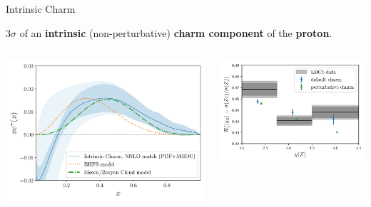 \documentclass[9pt]{beamer}
\begin{document}
\begin{frame}{Intrinsic Charm}
    \vspace*{-15pt}
    \begin{center}
        $3\sigma$ of an \textbf{intrinsic} (non-perturbative)
        \textbf{\alert{charm} component} of the \textbf{proton}.

    \end{center}
    \vspace*{15pt}

    \begin{columns}
        \begin{column}{0.5\textwidth}
            \begin{tcolorbox}
                \includegraphics[width=\textwidth]{nf3_to_models}
            \end{tcolorbox}
        \end{column}
        \begin{column}{0.5\textwidth}
            \begin{tcolorbox}
                \includegraphics[width=\textwidth]{lhcb-zcharm-pheno}
            \end{tcolorbox}
        \end{column}
    \end{columns}
\end{frame}
\end{document}
